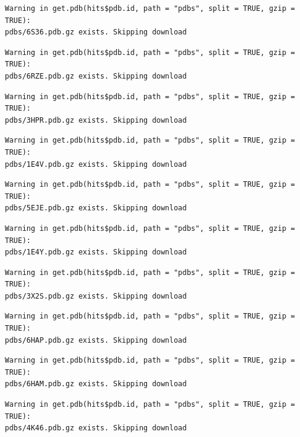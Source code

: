 \documentclass[
  letterpaper,
  DIV=11,
  numbers=noendperiod]{scrartcl}
\begin{document}
\begin{verbatim}
Warning in get.pdb(hits$pdb.id, path = "pdbs", split = TRUE, gzip = TRUE):
pdbs/6S36.pdb.gz exists. Skipping download
\end{verbatim}

\begin{verbatim}
Warning in get.pdb(hits$pdb.id, path = "pdbs", split = TRUE, gzip = TRUE):
pdbs/6RZE.pdb.gz exists. Skipping download
\end{verbatim}

\begin{verbatim}
Warning in get.pdb(hits$pdb.id, path = "pdbs", split = TRUE, gzip = TRUE):
pdbs/3HPR.pdb.gz exists. Skipping download
\end{verbatim}

\begin{verbatim}
Warning in get.pdb(hits$pdb.id, path = "pdbs", split = TRUE, gzip = TRUE):
pdbs/1E4V.pdb.gz exists. Skipping download
\end{verbatim}

\begin{verbatim}
Warning in get.pdb(hits$pdb.id, path = "pdbs", split = TRUE, gzip = TRUE):
pdbs/5EJE.pdb.gz exists. Skipping download
\end{verbatim}

\begin{verbatim}
Warning in get.pdb(hits$pdb.id, path = "pdbs", split = TRUE, gzip = TRUE):
pdbs/1E4Y.pdb.gz exists. Skipping download
\end{verbatim}

\begin{verbatim}
Warning in get.pdb(hits$pdb.id, path = "pdbs", split = TRUE, gzip = TRUE):
pdbs/3X2S.pdb.gz exists. Skipping download
\end{verbatim}

\begin{verbatim}
Warning in get.pdb(hits$pdb.id, path = "pdbs", split = TRUE, gzip = TRUE):
pdbs/6HAP.pdb.gz exists. Skipping download
\end{verbatim}

\begin{verbatim}
Warning in get.pdb(hits$pdb.id, path = "pdbs", split = TRUE, gzip = TRUE):
pdbs/6HAM.pdb.gz exists. Skipping download
\end{verbatim}

\begin{verbatim}
Warning in get.pdb(hits$pdb.id, path = "pdbs", split = TRUE, gzip = TRUE):
pdbs/4K46.pdb.gz exists. Skipping download
\end{verbatim}
\end{document}
